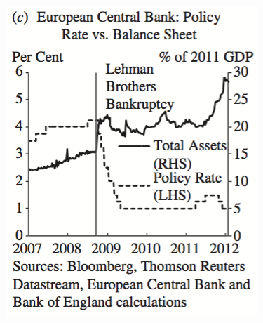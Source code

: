 \documentclass[11pt]{beamer}
\begin{document}
\begin{frame}
\begin{minipage}{0.33\textwidth}
    \end{minipage}\begin{minipage}{0.33\textwidth}
    	\includegraphics[width=\textwidth]{Figures/ECB_UnconvMonPol.png}
    \end{minipage}
\end{frame}

\end{document}
